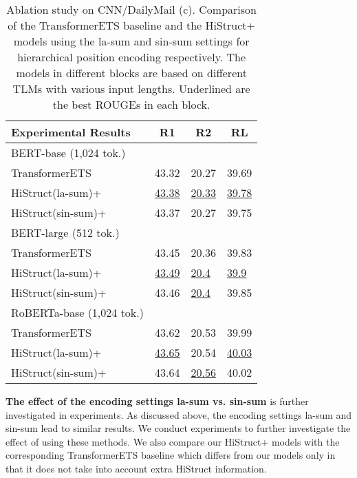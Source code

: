 \documentclass[11pt]{article}
\begin{document}
\begin{table}[ht]
\fontsize{9}{9}
\selectfont
\centering
\begin{tabular}{@{}llll@{}}
\toprule
Experimental Results & \multicolumn{1}{c}{R1} & \multicolumn{1}{c}{R2} & \multicolumn{1}{c}{RL}  \\ \midrule
BERT-base (1,024 tok.) & & &        \\ \midrule
TransformerETS            & 43.32 & 20.27 & 39.69 \\
HiStruct(la-sum)+  & \underline{43.38} & \underline{20.33} & \underline{39.78} \\
HiStruct(sin-sum)+ & 43.37 & 20.27 & 39.75 \\ \midrule
BERT-large (512 tok.) & & &          \\ \midrule
TransformerETS             & 43.45 & 20.36 & 39.83 \\
HiStruct(la-sum)+  & \underline{43.49} & \underline{20.4}  & \underline{39.9}  \\
HiStruct(sin-sum)+ & 43.46 & \underline{20.4}  & 39.85 \\ \midrule
RoBERTa-base (1,024 tok.) & & &      \\ \midrule
TransformerETS            & 43.62 & 20.53 & 39.99 \\
HiStruct(la-sum)+  & \underline{43.65} & 20.54 & \underline{40.03} \\
HiStruct(sin-sum)+ & 43.64 & \underline{20.56} & 40.02 \\ \bottomrule
\end{tabular}
\caption[Ablation study on CNN/DailyMail (c)]{Ablation study on CNN/DailyMail (c). Comparison of the TransformerETS baseline and the HiStruct+ models using the la-sum and sin-sum settings for hierarchical position encoding respectively. The models in different blocks are based on different TLMs with various input lengths. Underlined are the best ROUGEs in each block.}
\label{tab:cnndm_ablation_c}
\end{table}



\textbf{The effect of the encoding settings la-sum  vs. sin-sum} is further investigated in experiments. As discussed above, the encoding settings la-sum and sin-sum lead to similar results. We conduct experiments to further investigate the effect of using these methods. We also compare our HiStruct+ models with the corresponding TransformerETS baseline which differs from our models only in that it does not take into account extra HiStruct information. 
\end{document}
